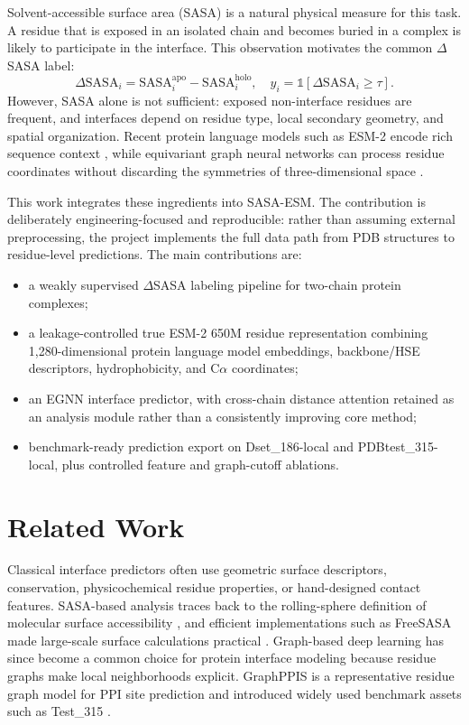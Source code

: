 \documentclass[runningheads]{llncs}
\begin{document}
Solvent-accessible surface area (SASA) is a natural physical measure for this task. A
residue that is exposed in an isolated chain and becomes buried in a complex is likely to
participate in the interface. This observation motivates the common \(\Delta\)SASA label:
\[
  \Delta\mathrm{SASA}_i =
  \mathrm{SASA}^{\mathrm{apo}}_i - \mathrm{SASA}^{\mathrm{holo}}_i,
  \quad
  y_i = \mathbb{1}[\Delta\mathrm{SASA}_i \ge \tau].
\]
However, SASA alone is not sufficient: exposed non-interface residues are frequent, and
interfaces depend on residue type, local secondary geometry, and spatial organization.
Recent protein language models such as ESM-2 encode rich sequence context
\cite{lin2023esm}, while equivariant graph neural networks can process residue
coordinates without discarding the symmetries of three-dimensional space
\cite{satorras2021egnn}.

This work integrates these ingredients into SASA-ESM. The contribution is deliberately
engineering-focused and reproducible: rather than assuming external preprocessing, the
project implements the full data path from PDB structures to residue-level predictions.
The main contributions are:
\begin{itemize}
  \item a weakly supervised \(\Delta\)SASA labeling pipeline for two-chain protein
  complexes;
  \item a leakage-controlled true ESM-2 650M residue representation combining
  1,280-dimensional protein language model embeddings, backbone/HSE descriptors,
  hydrophobicity, and C\(\alpha\) coordinates;
  \item an EGNN interface predictor, with cross-chain distance attention retained as
  an analysis module rather than a consistently improving core method;
  \item benchmark-ready prediction export on Dset\_186-local and PDBtest\_315-local,
  plus controlled feature and graph-cutoff ablations.
\end{itemize}

\section{Related Work}

Classical interface predictors often use geometric surface descriptors, conservation,
physicochemical residue properties, or hand-designed contact features. SASA-based
analysis traces back to the rolling-sphere definition of molecular surface accessibility
\cite{lee1971sasa}, and efficient implementations such as FreeSASA made large-scale
surface calculations practical \cite{mitternacht2016freesasa}. Graph-based deep learning
has since become a common choice for protein interface modeling because residue graphs
make local neighborhoods explicit. GraphPPIS is a representative residue graph model for
PPI site prediction and introduced widely used benchmark assets such as Test\_315
\cite{yuan2021graphppis}.
\end{document}
